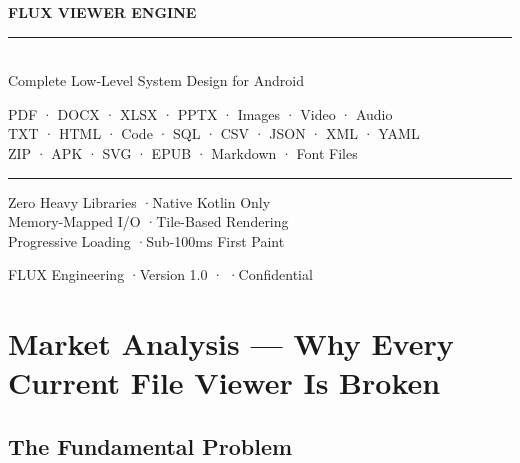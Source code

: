 \documentclass[12pt,a4paper]{report}
\begin{document}

\begin{titlepage}
\pagecolor{P1}\color{white}\centering
\vspace*{20mm}
{\sffamily\fontsize{56}{62}\selectfont\bfseries FLUX VIEWER ENGINE}
\vspace{6mm}

\color{white!70!P1}\rule{0.65\linewidth}{1.5pt}\vspace{5mm}

\color{white}{\sffamily\Large\bfseries Universal File Viewer \& Editor}\\[3mm]
{\sffamily\large Complete Low-Level System Design for Android}

\vspace{10mm}
{\sffamily\normalsize
  PDF · DOCX · XLSX · PPTX · Images · Video · Audio\\[3pt]
  TXT · HTML · Code · SQL · CSV · JSON · XML · YAML\\[3pt]
  ZIP · APK · SVG · EPUB · Markdown · Font Files
}

\vspace{12mm}\color{white!80!P1}\rule{0.45\linewidth}{0.6pt}\vspace{6mm}

{\sffamily\small
  Zero Heavy Libraries \enspace·\enspace Native Kotlin Only\\[3pt]
  Memory-Mapped I/O \enspace·\enspace Tile-Based Rendering\\[3pt]
  Progressive Loading \enspace·\enspace Sub-100ms First Paint
}

\vfill
{\sffamily\footnotesize\color{white!55!P1}
  FLUX Engineering \enspace·\enspace Version 1.0 \enspace· \enspace·\enspace Confidential
}
\end{titlepage}
\pagecolor{white}
\tableofcontents
\newpage

\chapter{Market Analysis — Why Every Current File Viewer Is Broken}

\section{The Fundamental Problem}
\end{document}
